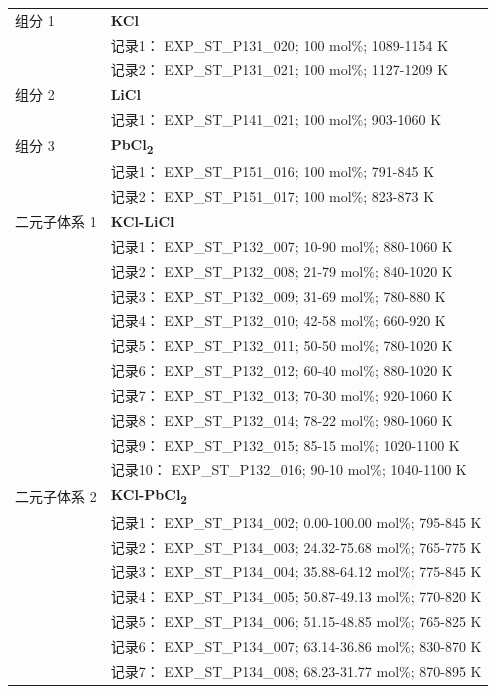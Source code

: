\documentclass[12pt]{article}
\begin{document}
{\begin{longtable}[]{@{}
  >{\raggedright\arraybackslash}p{}
  >{\raggedright\arraybackslash}p{}@{}}
组分 1  & \textbf{KCl} \\
 & 记录1： EXP\_ST\_P131\_020; 100 mol\%; 1089-1154 K \\
 & 记录2： EXP\_ST\_P131\_021; 100 mol\%; 1127-1209 K  \\

组分 2  & \textbf{LiCl} \\
 & 记录1： EXP\_ST\_P141\_021; 100 mol\%; 903-1060 K  \\

组分 3  & \textbf{PbCl\textsubscript{2}} \\
 & 记录1： EXP\_ST\_P151\_016; 100 mol\%; 791-845 K \\
 & 记录2： EXP\_ST\_P151\_017; 100 mol\%; 823-873 K  \\

二元子体系 1  & \textbf{KCl-LiCl} \\
 & 记录1： EXP\_ST\_P132\_007; 10-90 mol\%; 880-1060 K \\
 & 记录2： EXP\_ST\_P132\_008; 21-79 mol\%; 840-1020 K \\
 & 记录3： EXP\_ST\_P132\_009; 31-69 mol\%; 780-880 K \\
 & 记录4： EXP\_ST\_P132\_010; 42-58 mol\%; 660-920 K \\
 & 记录5： EXP\_ST\_P132\_011; 50-50 mol\%; 780-1020 K \\
 & 记录6： EXP\_ST\_P132\_012; 60-40 mol\%; 880-1020 K \\
 & 记录7： EXP\_ST\_P132\_013; 70-30 mol\%; 920-1060 K \\
 & 记录8： EXP\_ST\_P132\_014; 78-22 mol\%; 980-1060 K \\
 & 记录9： EXP\_ST\_P132\_015; 85-15 mol\%; 1020-1100 K \\
 & 记录10： EXP\_ST\_P132\_016; 90-10 mol\%; 1040-1100 K  \\

二元子体系 2  & \textbf{KCl-PbCl\textsubscript{2}} \\
 & 记录1： EXP\_ST\_P134\_002; 0.00-100.00 mol\%; 795-845 K \\
 & 记录2： EXP\_ST\_P134\_003; 24.32-75.68 mol\%; 765-775 K \\
 & 记录3： EXP\_ST\_P134\_004; 35.88-64.12 mol\%; 775-845 K \\
 & 记录4： EXP\_ST\_P134\_005; 50.87-49.13 mol\%; 770-820 K \\
 & 记录5： EXP\_ST\_P134\_006; 51.15-48.85 mol\%; 765-825 K \\
 & 记录6： EXP\_ST\_P134\_007; 63.14-36.86 mol\%; 830-870 K \\
 & 记录7： EXP\_ST\_P134\_008; 68.23-31.77 mol\%; 870-895 K  \\


\end{longtable}}
\end{document}
